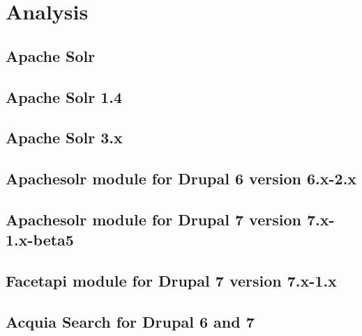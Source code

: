 \chapter{Analysis}
\section{Apache Solr}
\section{Apache Solr 1.4}
\section{Apache Solr 3.x}
\section{Apachesolr module for Drupal 6 version 6.x-2.x}
\section{Apachesolr module for Drupal 7 version 7.x-1.x-beta5}
\section{Facetapi module for Drupal 7 version 7.x-1.x}
\section{Acquia Search for Drupal 6 and 7}
